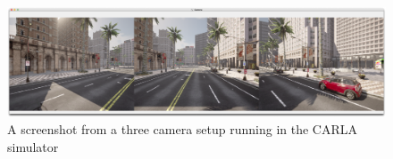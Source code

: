 \begin{figure}[ht]
    \centering
    \includegraphics[width=1.0\textwidth]{figures/carla-3-camera-setup.png}
    \caption{A screenshot from a three camera setup running in the CARLA simulator}
    \label{fig:carla-3-camera-setup}
\end{figure}